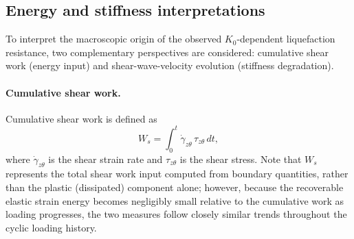 \documentclass[a4paper,fleqn]{cas-sc}
\newcommand{\Kzero}{\ensuremath{K_0}}
\begin{document}
\subsection{Energy and stiffness interpretations}
\label{subsec:energy_stiffness}

To interpret the macroscopic origin of the observed \Kzero{}-dependent liquefaction resistance, two complementary perspectives are considered: cumulative shear work (energy input) and shear-wave-velocity evolution (stiffness degradation).

\paragraph{Cumulative shear work.}
Cumulative shear work is defined as \citep{TowhataIshihara1985}
\begin{equation}
W_s = \int_0^t \dot{\gamma}_{z\theta}\,\tau_{z\theta}\,dt,
\label{eq:cumulative_shear_work}
\end{equation}
where $\dot{\gamma}_{z\theta}$ is the shear strain rate and $\tau_{z\theta}$ is the shear stress. Note that $W_s$ represents the total shear work input computed from boundary quantities, rather than the plastic (dissipated) component alone; however, because the recoverable elastic strain energy becomes negligibly small relative to the cumulative work as loading progresses, the two measures follow closely similar trends throughout the cyclic loading history.
\end{document}
